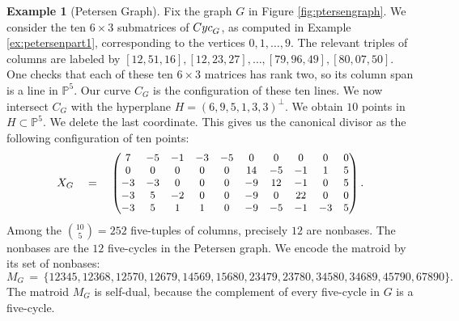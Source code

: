 \documentclass[12pt]{extarticle}
\theoremstyle{definition}
\newtheorem{example}[theorem]{Example}
\numberwithin{theorem}{section}
\theoremstyle{plain}\newtheorem{ithm}{Theorem}
\newcommand{\PP}{\mathbb{P}}
\begin{document}
\begin{example}[Petersen Graph]\label{ex:petersen}
Fix the graph $G$ in Figure \ref{fig:ptersengraph}.
  We consider the ten $6 \times 3$ submatrices of ${\rm Cyc}_G$, as computed in Example \ref{ex:petersenpart1}, corresponding to the vertices $0,1,\ldots,9$.
  The relevant triples of columns are
  labeled by $[12,51,16], [12,23,27], \ldots, [79,96,49], [80,07,50]$.
  One checks that each of these ten $6 \times 3$ matrices has rank two,
  so its column span is a line in $\PP^5$. Our curve $C_G$ is
  the configuration of these ten lines. We now intersect $C_G$ with
  the hyperplane $H = (6,9,5,1,3,3)^\perp$. We obtain $10$ points in $H \subset \PP^5$.
  We delete the last coordinate. This gives us the canonical divisor as the following configuration of
  ten points:
  \begin{equation}
  \label{eq:petersenmatrix}
   X_G \quad = \quad
  \begin{small} \begin{pmatrix}
      7 & -5 & -1 & -3 & -5 & 0 & 0 & 0 & 0 & 0 \\
      0 & 0 & 0 & 0 & 0 & 14 & -5 & -1 & 1 & 5 \\
      -3 & -3 & 0 & 0 & 0 & -9 & 12 & -1 & 0 & 5 \\
      -3 & 5 & -2 & 0 & 0 & -9 & 0 & 22 & 0 & 0 \\
      -3 & 5 & 1 & 1 & 0 & -9 & -5 & -1 & -3 & 5 \\
    \end{pmatrix}. \end{small}
  \end{equation}
  Among the $\binom{10}{5} = 252$ five-tuples of columns,
  precisely $12$ are nonbases.  The nonbases are  the $12$ five-cycles in the Petersen graph. 
  We encode the matroid by its set of nonbases:
  $$ M_G \,=\, \{
  {12345}, {12368}, {12570}, {12679}, {14569}, {15680}, {23479}, {23780}
  , {34580}, {34689}, {45790}, {67890} \}. $$
  The matroid $M_G$ is self-dual, because
  the complement of every five-cycle in $G$ is a five-cycle.
\end{example}
\end{document}
